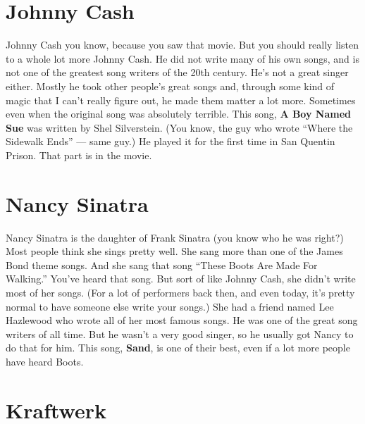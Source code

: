 \documentclass[letterpaper,12pt,single]{article}
\begin{document}
\section{Johnny Cash}

Johnny Cash you know, because you saw that movie. 
But you should really listen to a whole lot more Johnny Cash. 
He did not write many of his own songs, and is not one of the greatest song writers of the 20th century. 
He's not a great singer either. 
Mostly he took other people's great songs and, through some kind of magic that I can't really figure out, he made them matter a lot more. 
Sometimes even when the original song was absolutely terrible. 
This song, \textbf{A Boy Named Sue} was written by Shel Silverstein. 
(You know, the guy who wrote ``Where the Sidewalk Ends'' --- same guy.) 
He played it for the first time in San Quentin Prison. 
That part is in the movie.

\section{Nancy Sinatra}

Nancy Sinatra is the daughter of Frank Sinatra (you know who he was right?) 
Most people think she sings pretty well. 
She sang more than one of the James Bond theme songs. 
And she sang that song ``These Boots Are Made For Walking.'' 
You've heard that song. 
But sort of like Johnny Cash, she didn't write most of her songs. 
(For a lot of performers back then, and even today, it's pretty normal to have someone else write your songs.)
She had a friend named Lee Hazlewood who wrote all of her most famous songs. 
He was one of the great song writers of all time. 
But he wasn't a very good singer, so he usually got Nancy to do that for him. 
This song, \textbf{Sand}, is one of their best, even if a lot more people have heard Boots.

\section{Kraftwerk}
\end{document}
